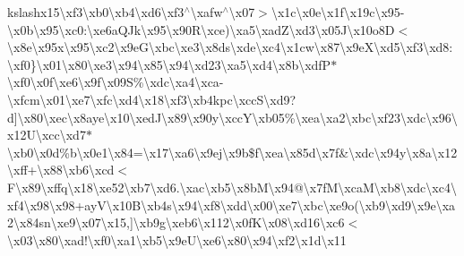 \begin{DoxyCompactItemize}
kslash{}x15\textbackslash{}xf3\textbackslash{}xb0\textbackslash{}xb4\textbackslash{}xd6\textbackslash{}xf3$^\wedge$\textbackslash{}xafw$^\wedge$\textbackslash{}x07$>$\textbackslash{}x1c\textbackslash{}x0e\textbackslash{}x1f\textbackslash{}x19c\textbackslash{}x95-\/\textbackslash{}x0b\textbackslash{}x95\textbackslash{}xc0\+:\textbackslash{}xe6a\+Q\+Jk\textbackslash{}x95\textbackslash{}x90\+R\textbackslash{}xce)\textbackslash{}xa5\textbackslash{}xad\+Z\textbackslash{}xd3\textbackslash{}x05\+J\textbackslash{}x10o8\+D$<$\textbackslash{}x8e\textbackslash{}x95x\textbackslash{}x95\textquotesingle{}\textbackslash{}xc2\textbackslash{}x9e\+G\textbackslash{}xbc\textbackslash{}xe3\textbackslash{}x8ds\textbackslash{}xde\textbackslash{}xc4\textbackslash{}x1cw\textbackslash{}x87\textbackslash{}x9e\+X\textbackslash{}xd5\textbackslash{}xf3\textbackslash{}xd8\+:\textbackslash{}xf0\}\textbackslash{}x01\textbackslash{}x80\textbackslash{}xe3\textbackslash{}x94\textbackslash{}x85\textbackslash{}x94\textbackslash{}xd23\textbackslash{}xa5\textbackslash{}xd4\textbackslash{}x8b\textbackslash{}xdf\+P$\ast$\textbackslash{}xf0\textbackslash{}x0f\textbackslash{}xe6\textbackslash{}x9f\textbackslash{}x09\+S\%\textbackslash{}xdc\textbackslash{}xa4\textbackslash{}xca-\/\textbackslash{}xfcm\textbackslash{}x01\textbackslash{}xe7\textbackslash{}xfc\textbackslash{}xd4\textbackslash{}x18\textbackslash{}xf3\textbackslash{}xb4kpc\textbackslash{}xcc\+S\textbackslash{}xd9?d\mbox{]}\textbackslash{}x80\textbackslash{}xec\textbackslash{}x8aye\textbackslash{}x10\textbackslash{}xed\+J\textbackslash{}x89\textbackslash{}x90y\textbackslash{}xcc\+Y\textbackslash{}xb05\%\textbackslash{}xea\textbackslash{}xa2\textbackslash{}xbc\textbackslash{}xf23\textbackslash{}xdc\textbackslash{}x96\textbackslash{}x12\+U\textbackslash{}xcc\textbackslash{}xd7$\ast$\textbackslash{}xb0\textbackslash{}x0d\%b\textbackslash{}x0e1\textbackslash{}x84=\textbackslash{}x17\textbackslash{}xa6\textbackslash{}x9ej\textbackslash{}x9b\$f\textbackslash{}xea\textbackslash{}x85d\textbackslash{}x7f\&\textbackslash{}xdc\textbackslash{}x94y\textbackslash{}x8a\textbackslash{}x12\textbackslash{}xff+\textbackslash{}x88\textbackslash{}xb6\textbackslash{}xcd$<$\+F\textbackslash{}x89\textbackslash{}xffq\textbackslash{}x18\textbackslash{}xe52\textbackslash{}xb7\textbackslash{}xd6.\textbackslash{}xac\textbackslash{}xb5\textbackslash{}x8b\+M\textbackslash{}x94@\textbackslash{}x7f\+M\textbackslash{}xca\+M\textbackslash{}xb8\textbackslash{}xdc\textbackslash{}xc4\textbackslash{}xf4\textbackslash{}x98\textbackslash{}x98+ay\+V\textbackslash{}x10\+B\textbackslash{}xb4s\textbackslash{}x94\textbackslash{}xf8\textbackslash{}xdd\textbackslash{}x00\textbackslash{}xe7\textbackslash{}xbc\textbackslash{}xe9o(\textbackslash{}xb9\textbackslash{}xd9\textbackslash{}x9e\textbackslash{}xa2\textbackslash{}x84sn\textbackslash{}xe9\textbackslash{}x07\textbackslash{}x15,\mbox{]}\textbackslash{}xb9g\textbackslash{}xeb6\textbackslash{}x112\textbackslash{}x0f\+K\textbackslash{}x08\textbackslash{}xd16\textbackslash{}xc6$<$\textbackslash{}x03\textbackslash{}x80\textbackslash{}xad!\textbackslash{}xf0\textbackslash{}xa1\textbackslash{}xb5\textbackslash{}x9e\+U\textbackslash{}xe6\textbackslash{}x80\textbackslash{}x94\textbackslash{}xf2\textbackslash{}x1d\textbackslash{}x11\textb
\end{DoxyCompactItemize}
